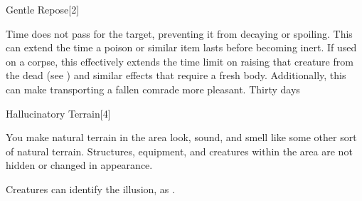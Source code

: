 \begin{spellsection}{Gentle Repose}[2]
    \begin{spellheader}
    \end{spellheader}
    \begin{spellcontent}
        \begin{spelltargetinginfo}
        \end{spelltargetinginfo}
        \begin{spelleffects}
            \spelleffect Time does not pass for the target, preventing it from decaying or spoiling. This can extend the time a poison or similar item lasts before becoming inert. If used on a corpse, this effectively extends the time limit on raising that creature from the dead (see ) and similar effects that require a fresh body. Additionally, this can make transporting a fallen comrade more pleasant.
            \spelldur Thirty days \dismissable
        \end{spelleffects}
    \end{spellcontent}
    \begin{spellfooter}
    \end{spellfooter}
    \begin{spellaugments}
    \end{spellaugments}
\end{spellsection}

\begin{spellsection}{Hallucinatory Terrain}[4]
    \begin{spellheader}
    \end{spellheader}
    \begin{spellcontent}
        \begin{spelltargetinginfo}
        \end{spelltargetinginfo}
        \begin{spelleffects}
            \spelleffect You make natural terrain in the area look, sound, and smell like some other sort of natural terrain. Structures, equipment, and creatures within the area are not hidden or changed in appearance.
            \spelldur \durext \dismissable
        \end{spelleffects}
    \end{spellcontent}
    \begin{spellfooter}
        \spellnotes Creatures can identify the illusion, as .
    \end{spellfooter}
    \begin{spellaugments}
    \end{spellaugments}
\end{spellsection}

